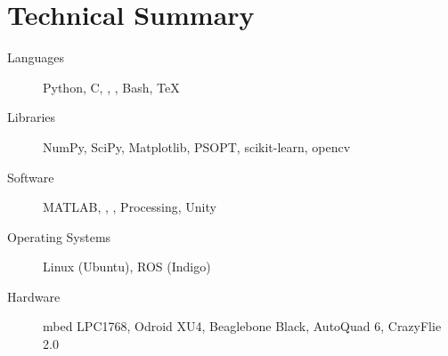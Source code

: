 \documentclass{simplecv}
\begin{document}
\maketitle
\vfill
\section{Technical Summary}
\begin{minipage}{\textwidth}
\begin{description}
\item[Languages]
    Python,
    C,
    \CPP,
    \CSharp,
    Bash,
    \TeX

\item[Libraries]
    NumPy,
    SciPy,
    Matplotlib,
    PSOPT,
    scikit-learn,
    opencv

\item[Software]
    MATLAB,
  ,
  ,
  Processing,
  Unity

\item[Operating Systems]
    Linux (Ubuntu),
    ROS (Indigo)
\item[Hardware]
    mbed LPC1768,
    Odroid XU4,
    Beaglebone Black,
    AutoQuad 6,
    CrazyFlie 2.0
\end{description}
\end{minipage}

\vfill
\end{document}
